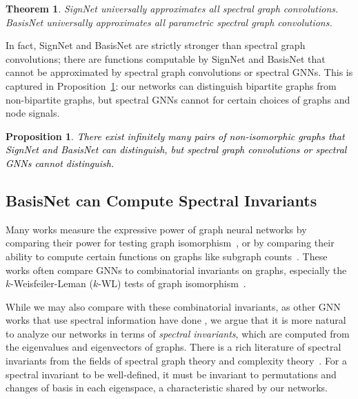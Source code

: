 \documentclass{article} \usepackage{iclr2023_conference,times}
\newtheorem{theorem}{Theorem}
\newtheorem{proposition}{Proposition}
\newcommand{\rebut}[1]{\textcolor{black}{#1}}
\begin{document}
\begin{theorem}\label{prop:spectral_conv}
    SignNet universally approximates all spectral graph convolutions. BasisNet universally approximates all parametric spectral graph convolutions.
\end{theorem}

In fact, SignNet and BasisNet are strictly stronger than spectral graph convolutions; there are functions computable by SignNet and BasisNet that cannot be approximated by spectral graph convolutions or spectral GNNs. This is captured in Proposition~\ref{prop:signnet_strictly_greater_conv}: our networks can distinguish bipartite graphs from non-bipartite graphs, but spectral GNNs cannot for certain choices of graphs and node signals.

\begin{proposition}\label{prop:signnet_strictly_greater_conv}
\rebut{There exist infinitely many pairs of non-isomorphic graphs that SignNet and BasisNet can distinguish, but spectral graph convolutions or spectral GNNs cannot distinguish.}
\end{proposition}


\subsection{BasisNet can Compute Spectral Invariants}

Many works measure the expressive power of graph neural networks by comparing their power for testing graph isomorphism~\citep{xu2018powerful, sato2020survey}, or by comparing their ability to compute certain functions on graphs like subgraph counts~\citep{chen2020can, tahmasebi2020counting}. These works often compare GNNs to combinatorial invariants on graphs, especially the $k$-Weisfeiler-Leman ($k$-WL) tests of graph isomorphism~\citep{morris2021weisfeiler}.

While we may also compare with these combinatorial invariants, as other GNN works that use spectral information have done \citep{beaini2021directional}, we argue that it is more natural to analyze our networks in terms of \textit{spectral invariants}, which are computed from the eigenvalues and eigenvectors of graphs. There is a rich literature of spectral invariants from the fields of spectral graph theory and complexity theory~\citep{cvetkovic1997eigenspaces}. For a spectral invariant to be well-defined, it must be invariant to permutations and changes of basis in each eigenspace, a  characteristic shared by our networks.
\end{document}
